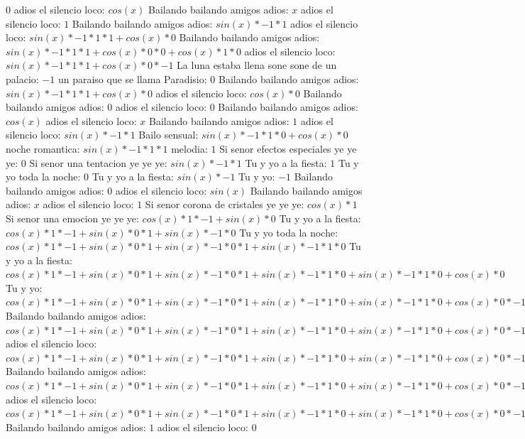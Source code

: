 \documentclass{article}
\begin{document}
$0$  \newline adios el silencio loco: $cos(x)$  \newline Bailando bailando amigos adios: $x$ adios el silencio loco: $1$  \newline Bailando bailando amigos adios: $sin(x)*-1*1$ adios el silencio loco: $sin(x)*-1*1*1+cos(x)*0$ Bailando bailando amigos adios: ${sin(x)*-1*1*1+cos(x)*0}*0+cos(x)*1*0$ adios el silencio loco: ${sin(x)*-1*1*1+cos(x)*0}*-1$ La luna estaba llena sone sone de un palacio: $-1$ un paraiso que se llama Paradisio: $0$  \newline Bailando bailando amigos adios: $sin(x)*-1*1*1+cos(x)*0$  \newline adios el silencio loco: $cos(x)*0$ Bailando bailando amigos adios: $0$ adios el silencio loco: $0$  \newline Bailando bailando amigos adios: $cos(x)$  \newline adios el silencio loco: $x$ Bailando bailando amigos adios: $1$  \newline adios el silencio loco: $sin(x)*-1*1$ Bailo sensual: $sin(x)*-1*1*0+cos(x)*0$ noche romantica: $sin(x)*-1*1*1$ melodia: $1$ Si senor efectos especiales ye ye ye: $0$  \newline Si senor una tentacion ye ye ye: $sin(x)*-1*1$ Tu y yo a la fiesta: $1$ Tu y yo toda la noche: $0$  \newline Tu y yo a la fiesta: $sin(x)*-1$ Tu y yo: $-1$ Bailando bailando amigos adios: $0$  \newline adios el silencio loco: $sin(x)$  \newline Bailando bailando amigos adios: $x$ adios el silencio loco: $1$  \newline Si senor corona de cristales ye ye ye: $cos(x)*1$ Si senor una emocion ye ye ye: $cos(x)*1*-1+sin(x)*0$ Tu y yo a la fiesta: ${cos(x)*1*-1+sin(x)*0}*1+sin(x)*-1*0$ Tu y yo toda la noche: ${{cos(x)*1*-1+sin(x)*0}*1+sin(x)*-1*0}*1+sin(x)*-1*1*0$ Tu y yo a la fiesta: ${{cos(x)*1*-1+sin(x)*0}*1+sin(x)*-1*0}*1+sin(x)*-1*1*0+sin(x)*-1*1*0+cos(x)*0$ Tu y yo: ${{{cos(x)*1*-1+sin(x)*0}*1+sin(x)*-1*0}*1+sin(x)*-1*1*0+sin(x)*-1*1*0+cos(x)*0}*-1+{sin(x)*-1*1*1+cos(x)*0}*0$ Bailando bailando amigos adios: ${{{cos(x)*1*-1+sin(x)*0}*1+sin(x)*-1*0}*1+sin(x)*-1*1*0+sin(x)*-1*1*0+cos(x)*0}*-1+{sin(x)*-1*1*1+cos(x)*0}*0+{sin(x)*-1*1*1+cos(x)*0}*0+cos(x)*1*0$ adios el silencio loco: ${{{cos(x)*1*-1+sin(x)*0}*1+sin(x)*-1*0}*1+sin(x)*-1*1*0+sin(x)*-1*1*0+cos(x)*0}*-1+{sin(x)*-1*1*1+cos(x)*0}*0+{sin(x)*-1*1*1+cos(x)*0}*0+cos(x)*1*0+{sin(x)*-1*1*1+cos(x)*0}*0+cos(x)*1*0+cos(x)*1*0+sin(x)*0$ Bailando bailando amigos adios: ${{{{cos(x)*1*-1+sin(x)*0}*1+sin(x)*-1*0}*1+sin(x)*-1*1*0+sin(x)*-1*1*0+cos(x)*0}*-1+{sin(x)*-1*1*1+cos(x)*0}*0+{sin(x)*-1*1*1+cos(x)*0}*0+cos(x)*1*0+{sin(x)*-1*1*1+cos(x)*0}*0+cos(x)*1*0+cos(x)*1*0+sin(x)*0}*0+{{sin(x)*-1*1*1+cos(x)*0}*-1+cos(x)*1*0+cos(x)*1*0+sin(x)*0}*0$ adios el silencio loco: ${{{{cos(x)*1*-1+sin(x)*0}*1+sin(x)*-1*0}*1+sin(x)*-1*1*0+sin(x)*-1*1*0+cos(x)*0}*-1+{sin(x)*-1*1*1+cos(x)*0}*0+{sin(x)*-1*1*1+cos(x)*0}*0+cos(x)*1*0+{sin(x)*-1*1*1+cos(x)*0}*0+cos(x)*1*0+cos(x)*1*0+sin(x)*0}*1$ Bailando bailando amigos adios: $1$ adios el silencio loco: $0$  \newline 
\end{document}

